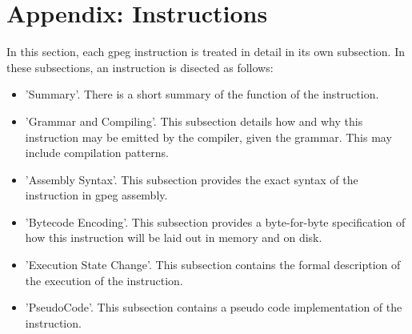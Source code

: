 \section{Appendix: Instructions}

In this section, each gpeg instruction is treated in detail in its own subsection.
In these subsections, an instruction is disected as follows:

\begin{itemize}
\item 'Summary'. There is a short summary of the function of the instruction.
\item 'Grammar and Compiling'. This subsection details how and why this
      instruction may be emitted by the compiler, given the grammar.
      This may include compilation patterns.
\item 'Assembly Syntax'. This subsection provides the exact syntax of
      the instruction in gpeg assembly.
\item 'Bytecode Encoding'. This subsection provides a byte-for-byte
      specification of how this instruction will be laid out in memory
      and on disk.
\item 'Execution State Change'. This subsection contains the formal
      description of the execution of the instruction.
\item 'PseudoCode'. This subsection contains a pseudo code implementation
      of the instruction.
\end{itemize}
